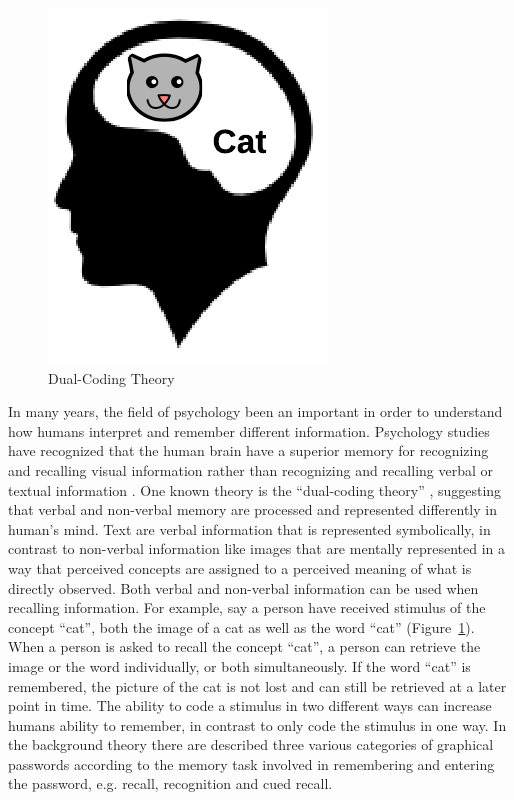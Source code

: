   \begin{figure}
    \vspace{-20pt}
    \begin{center}
      \includegraphics[scale=0.35]{pics/dualCoding.png}
    \end{center}
    \vspace{-20pt}
    \caption{Dual-Coding Theory}
    \vspace{-10pt}
    \label{fig:dualcoding}
  \end{figure}

  In many years, the field of psychology been an important in order to understand how humans interpret and remember different information. Psychology studies have recognized that the human brain have a superior memory for recognizing and recalling visual information rather than recognizing and recalling verbal or textual information \cite{DeAngeli}. One known theory is the ``dual-coding theory'' \cite{Biddle}, suggesting that verbal and non-verbal memory are processed and represented differently in human's mind. Text are verbal information that is represented symbolically, in contrast to non-verbal information like images that are mentally represented in a way that perceived concepts are assigned to a perceived meaning of what is directly observed. Both verbal and non-verbal information can be used when recalling information. For example, say a person have received stimulus of the concept ``cat'', both the image of a cat as well as the word ``cat'' (Figure~\ref{fig:dualcoding}). When a person is asked to recall the concept ``cat'', a person can retrieve the image or the word individually, or both simultaneously. If the word ``cat'' is remembered, the picture of the cat is not lost and can still be retrieved at a later point in time. The ability to code a stimulus in two different ways can increase humans ability to remember, in contrast to only code the stimulus in one way. In the background theory there are described three various categories of graphical passwords according to the memory task involved in remembering and entering the password, e.g. recall, recognition and cued recall.

